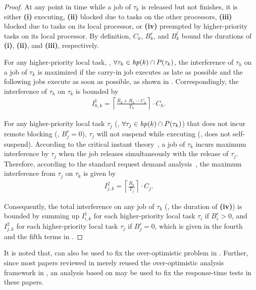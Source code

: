 \begin{proof}
At any point in time while a job of $\tau_k$ is released but not finishes, it is either \textbf{(i)} executing, \textbf{(ii)} blocked due to tasks on the other processors, \textbf{(iii)} blocked due to tasks on its local processor, or \textbf{(iv)} preempted by higher-priority tasks on its local processor. 
By definition, $C_k$, $B_k^r$, and $B_k^l$ bound the durations of \textbf{(i)}, \textbf{(ii)}, and \textbf{(iii)}, respectively.

For any higher-priority local task, \ie, $\forall \tau_h \in \mathit{hp}(k) \cap P(\tau_k)$, the interference of $\tau_h$ on a job of $\tau_k$ is maximized if the carry-in job executes as late as possible and the following jobs execute as soon as possible, as shown in . Correspondingly, the interference of $\tau_h$ on $\tau_k$ is bounded by 
\begin{align*}
I_{h,k}^1 = \left \lceil \frac{R_k + R_h - C_h}{T_h} \right \rceil \cdot C_h.
\end{align*}

For any higher-priority local task $\tau_j$ (\ie, $\forall \tau_j \in \mathit{hp}(k) \cap P(\tau_k)$) that does not incur remote blocking (\ie, $B_j^r = 0$), $\tau_j$ will not suspend while executing (\ie, does not self-suspend). According to the critical instant theory~\cite{LL-1973}, a job of $\tau_k$ incurs maximum interference by $\tau_j$ when the job releases simultaneously with the release of $\tau_j$. Therefore, according to the standard request demand analysis~\cite{audsley-1993}, the maximum interference from $\tau_j$ on $\tau_k$ is given by 
\begin{align*}
I_{j,k}^2 = \left \lceil \frac{R_k}{T_j} \right \rceil \cdot C_j.
\end{align*}

Consequently, the total interference on any job of $\tau_k$ (\ie, the duration of \textbf{(iv)}) is bounded by summing up $I_{i,k}^1$ for each higher-priority local task $\tau_i$ if $B_i^r > 0$, and $I_{j,k}^2$ for each higher-priority local task $\tau_j$ if $B_j^r = 0$, which is given in the fourth and the fifth terms in .
\end{proof} 

It is noted that,  can also be used to fix the over-optimistic problem in \cite{NBN:11}. Further, since most papers reviewed in  merely reused the over-optimistic analysis framework in \cite{lakshmanan-2009}, an analysis based on  may be used to fix the response-time tests in these papers.